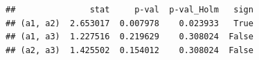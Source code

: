 \documentclass[polish,]{book}
\begin{document}
\begin{verbatim}
##               stat     p-val  p-val_Holm   sign
## (a1, a2)  2.653017  0.007978    0.023933   True
## (a1, a3)  1.227516  0.219629    0.308024  False
## (a2, a3)  1.425502  0.154012    0.308024  False
\end{verbatim}


\end{document}
